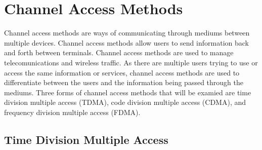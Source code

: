 \documentclass[12pt]{report}
\begin{document}
\section{Channel Access Methods}

Channel access methods are ways of communicating through mediums between multiple devices. Channel access methods allow users to send information back and forth between terminals. Channel access methods are used to manage telecomunications and wireless traffic. As there are multiple users trying to use or access the same information or services, channel access methods are used to differentiate between the users and the information being passed through the mediums. Three forms of channel access methods that will be examied are time division multiple access (TDMA), code division multiple access (CDMA), and frequency division multiple access (FDMA). 

\subsection{Time Division Multiple Access}\label{sec:TDMAsection}
\end{document}
